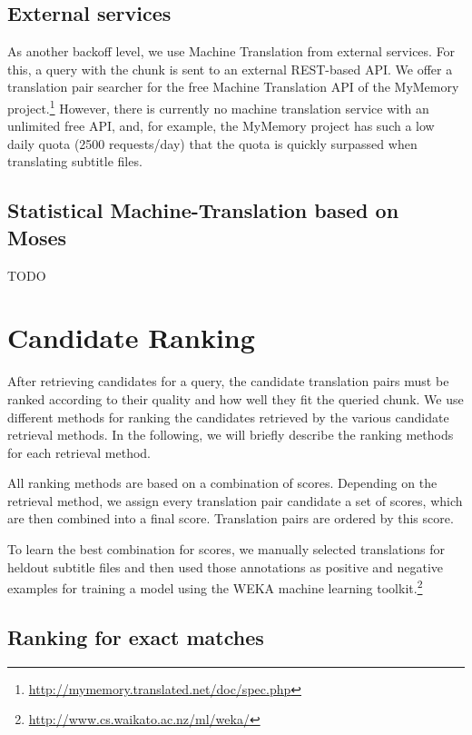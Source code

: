 \subsection{External services}

As another backoff level, we use Machine Translation from external services.
For this, a query with the chunk is sent to an external REST-based API. We offer a translation pair searcher for the free Machine Translation API of the MyMemory project.\footnote{ \url{http://mymemory.translated.net/doc/spec.php}} However, there is currently no machine translation service with an unlimited free API, and, for example, the MyMemory project has such a low daily quota (2500 requests/day) that the quota is quickly surpassed when translating subtitle files.

\subsection{Statistical Machine-Translation based on Moses}

TODO



\section{Candidate Ranking}
\label{sec:ranking}

After retrieving candidates for a query, the candidate translation pairs must be ranked according to their quality and how well they fit the queried chunk. We use different methods for ranking the candidates retrieved by the various candidate retrieval methods. In the following, we will briefly describe the ranking methods for each retrieval method.

All ranking methods are based on a combination of scores. Depending on the retrieval method, we assign every translation pair candidate a set of scores, which are then combined into a final score.  Translation pairs are ordered by this score.

To learn the best combination for scores, we manually selected translations for heldout subtitle files and then used those annotations as positive and negative examples for training a model using the WEKA machine learning toolkit.\footnote{\url{http://www.cs.waikato.ac.nz/ml/weka/}}


\subsection{Ranking for exact matches}

